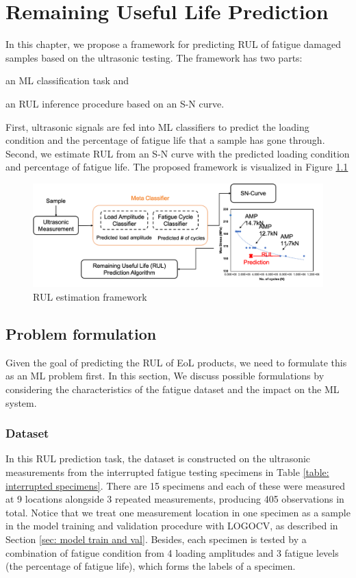 \chapter{Remaining Useful Life Prediction}
\label{chap: rul}

In this chapter, we propose a framework for predicting RUL of fatigue damaged samples based on the ultrasonic testing. The framework has two parts: \begin{enumerate*}[label=\itshape\alph*\upshape)]
    \item an ML classification task and
    \item an RUL inference procedure based on an S-N curve.
\end{enumerate*}  First, ultrasonic signals are fed into ML classifiers to predict the loading condition and the percentage of fatigue life that a sample has gone through. Second, we estimate RUL from an S-N curve with the predicted loading condition and percentage of fatigue life. The proposed framework is visualized in Figure \ref{fig: rul framework}

\begin{figure}
    \centering
    \includegraphics[width=\linewidth]{fig/rul_framework.png}
    \caption{RUL estimation framework}
    \label{fig: rul framework}
\end{figure}

\section{Problem formulation}
\label{sec: rul prob formulation}
Given the goal of predicting the RUL of EoL products, we need to formulate this as an ML problem first. In this section, We discuss possible formulations by considering the characteristics of the fatigue dataset and the impact on the ML system.

\subsection{Dataset}
In this RUL prediction task, the dataset is constructed on the ultrasonic measurements from the interrupted fatigue testing specimens in Table \ref{table: interrupted specimens}. There are 15 specimens and each of these were measured at 9 locations alongside 3 repeated measurements, producing 405 observations in total. Notice that we treat one measurement location in one specimen as a sample in the model training and validation procedure with LOGOCV, as described in Section \ref{sec: model train and val}. Besides, each specimen is tested by a combination of fatigue condition from 4 loading amplitudes and 3 fatigue levels (the percentage of fatigue life), which forms the labels of a specimen.


